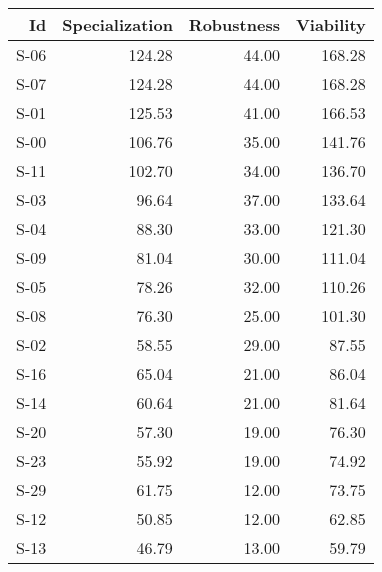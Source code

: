 \begin{tabular}{ | r | r | r | r | }
    \hline
                    Id  &  Specialization  &      Robustness  &       Viability  \\
    \hline
    \hline
                  S-06  &          124.28  &           44.00  &          168.28  \\
    \hline
                  S-07  &          124.28  &           44.00  &          168.28  \\
    \hline
                  S-01  &          125.53  &           41.00  &          166.53  \\
    \hline
                  S-00  &          106.76  &           35.00  &          141.76  \\
    \hline
                  S-11  &          102.70  &           34.00  &          136.70  \\
    \hline
                  S-03  &           96.64  &           37.00  &          133.64  \\
    \hline
                  S-04  &           88.30  &           33.00  &          121.30  \\
    \hline
                  S-09  &           81.04  &           30.00  &          111.04  \\
    \hline
                  S-05  &           78.26  &           32.00  &          110.26  \\
    \hline
                  S-08  &           76.30  &           25.00  &          101.30  \\
    \hline
                  S-02  &           58.55  &           29.00  &           87.55  \\
    \hline
                  S-16  &           65.04  &           21.00  &           86.04  \\
    \hline
                  S-14  &           60.64  &           21.00  &           81.64  \\
    \hline
                  S-20  &           57.30  &           19.00  &           76.30  \\
    \hline
                  S-23  &           55.92  &           19.00  &           74.92  \\
    \hline
                  S-29  &           61.75  &           12.00  &           73.75  \\
    \hline
                  S-12  &           50.85  &           12.00  &           62.85  \\
    \hline
                  S-13  &           46.79  &           13.00  &           59.79  \\

\end{tabular}
